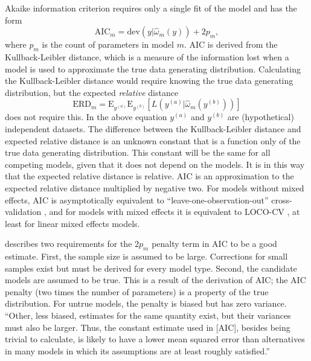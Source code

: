 Akaike information criterion \parencite[AIC;][]{akaike1974new} requires only a single fit of the model and has the form
\begin{equation} \label{eq:aic}
	\mathrm{AIC}_m = \mathrm{dev}(y | \hat \omega_m(y)) + 2p_m
,\end{equation}
where $p_m$ is the count of parameters in model $m$. 
AIC is derived from the Kullback-Leibler distance, which is a measure of the information lost when a model is used to approximate the true data generating distribution. Calculating the Kullback-Leibler distance would require knowing the true data generating distribution, but the expected \emph{relative} distance
\begin{equation}
	\mathrm{ERD}_m = \mathrm{E}_{y^{(a)}} \mathrm{E}_{y^{(b)}} [L(y^{(a)} |\hat \omega_m(y^{(b)}))]
\end{equation}
does not require this.
In the above equation $y^{(a)}$ and $y^{(b)}$ are (hypothetical) independent datasets. The difference between the Kullback-Leibler distance and expected relative distance is an unknown constant that is a function only of the true data generating distribution. This constant will be the same for all competing models, given that it does not depend on the models. 
It is in this way that the expected relative distance is relative.
AIC is an approximation to the expected relative distance multiplied by negative two. For models without mixed effects, AIC is asymptotically equivalent to  ``leave-one-observation-out'' cross-validation \parencite{stone1977asymptotic}, and for models with mixed effects it is equivalent to LOCO-CV \parencite{fang2011asymptotic}, at least for linear mixed effects models.

\textcite{Kuha2004} describes two requirements for the $2p_m$ penalty term in AIC to be a good estimate. First, the sample size is assumed to be large. Corrections for small samples exist but must be derived for every model type. Second, the candidate models are assumed to be true. This is a result of the derivation of AIC; the AIC penalty (two times the number of parameters) is a property of the true distribution. For untrue models, the penalty is biased but has zero variance. ``Other, less biased, estimates for the same quantity exist, but their variances must also be larger. Thus, the constant estimate used in [AIC], besides being trivial to calculate, is likely to have a lower mean squared error than alternatives in many models in which its assumptions are at least roughly satisfied.''

